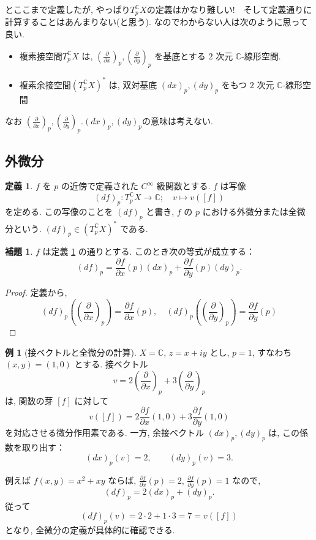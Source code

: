 \documentclass[dvipdfmx,a4paper,11pt]{article} %
\newcommand{\C}{\mathbb{C}}
\theoremstyle{definition}
\numberwithin{equation}{section}
\newtheorem{lem}[thm]{補題}
\newtheorem{dfn}[thm]{定義}
\newtheorem{exa}[thm]{例}
\begin{document}
とここまで定義したが, やっぱり$T_{p}^{\C}X$の定義はかなり難しい!　そして定義通りに計算することはあんまりない(と思う). 
なのでわからない人は次のように思って良い. 
\begin{tcolorbox}[mybox]

\begin{itemize}
\item 複素接空間$T_{p}^{\C}X$ は, 
\(
\left(\frac{\partial}{\partial x}\right)_p,
\left(\frac{\partial}{\partial y}\right)_p
\)
を基底とする $2$ 次元 $\C$-線形空間. 
\item  複素余接空間$(T_{p}^{\C}X)^*$ は, 
双対基底
\(
(dx)_p, (dy)_p
\)
をもつ $2$ 次元 $\C$-線形空間
\end{itemize}
なお
$
\left(\frac{\partial}{\partial x}\right)_p,
\left(\frac{\partial}{\partial y}\right)_p. 
(dx)_p, (dy)_p$の意味は考えない. 
\end{tcolorbox}

\subsection{外微分}\label{sec-differential-functions}

\begin{dfn}\label{O-M083}
$f$ を $p$ の近傍で定義された $C^\infty$ 級関数とする. $f$ は写像
\[
(df)_p : T_{p}^{\C}X\to \C{};\quad v\longmapsto v([f])
\]
を定める. この写像のことを $(df)_p$ と書き, $f$ の $p$ における外微分または全微分という.
$(df)_p\in (T_{p}^{\C}X)^*$ である.
\end{dfn}

\begin{lem}\label{O-M084}
$f$ は定義 \ref{O-M083} の通りとする. このとき次の等式が成立する：
\[
(df)_p=\frac{\partial f}{\partial x}(p)(dx)_p+\frac{\partial f}{\partial y}(p)(dy)_p.
\]
\end{lem}

\begin{proof}
定義から,
\[
(df)_p\left(\left(\frac{\partial}{\partial x}\right)_p\right)=\frac{\partial f}{\partial x}(p),\quad
(df)_p\left(\left(\frac{\partial}{\partial y}\right)_p\right)=\frac{\partial f}{\partial y}(p)
\]
\end{proof}

\begin{exa}[接ベクトルと全微分の計算]
$X=\C$, $z=x+iy$ とし, $p=1$, すなわち $(x,y)=(1,0)$ とする.
接ベクトル
\[
v=2\left(\frac{\partial}{\partial x}\right)_p
 +3\left(\frac{\partial}{\partial y}\right)_p
\]
は, 関数の芽 $[f]$ に対して
\[
v([f])=2\frac{\partial f}{\partial x}(1,0)+3\frac{\partial f}{\partial y}(1,0)
\]
を対応させる微分作用素である.
一方, 余接ベクトル $(dx)_p,(dy)_p$ は, この係数を取り出す：
\[
(dx)_p(v)=2,\qquad (dy)_p(v)=3.
\]

例えば $f(x,y)=x^2+xy$ ならば, 
$\frac{\partial f}{\partial x}(p)=2$, $\frac{\partial f}{\partial y}(p)=1$ なので, 
\[
(df)_p=2(dx)_p+(dy)_p.
\]
従って
\[
(df)_p(v)=2\cdot2+1\cdot3=7=v([f])
\]
となり, 全微分の定義が具体的に確認できる.
\end{exa}
\end{document}
